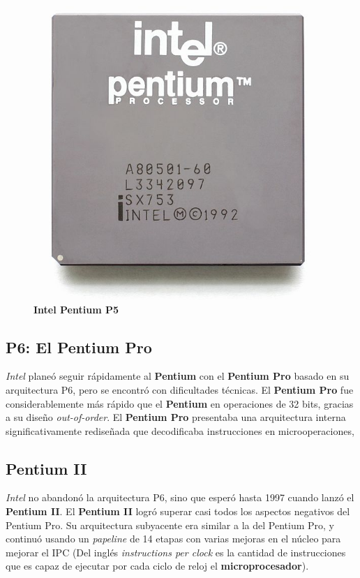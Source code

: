 \begin{figure}[htb]
	\centering
	\includegraphics[scale = 0.15]{Graphics/Intel_Pentium_P5.jpg}
	\caption{\textbf{Intel Pentium P5}}
	\label{fig:22}
\end{figure}

\subsection{P6: El \textbf{Pentium} Pro}
\emph{Intel} planeó seguir rápidamente al \textbf{Pentium} con el \textbf{Pentium Pro} basado en su arquitectura P6, pero se encontró con dificultades técnicas. El \textbf{Pentium Pro} 
fue considerablemente más rápido que el \textbf{Pentium} en operaciones de 32 bits, gracias a su diseño \emph{out-of-order}. El \textbf{Pentium Pro} presentaba una arquitectura interna
significativamente rediseñada que decodificaba instrucciones en microoperaciones,

\subsection{\textbf{Pentium II}}
\emph{Intel} no abandonó la arquitectura P6, sino que esperó hasta 1997 cuando lanzó el \textbf{Pentium II}. El \textbf{Pentium II} logró superar casi todos los aspectos negativos del Pentium Pro. 
Su arquitectura subyacente era similar a la del Pentium Pro, y continuó usando un \emph{papeline} de 14 etapas con varias mejoras en el núcleo para mejorar el IPC
(Del inglés \emph{instructions per clock} es la cantidad de instrucciones que es capaz de ejecutar por cada ciclo de reloj el \textbf{microprocesador}).

